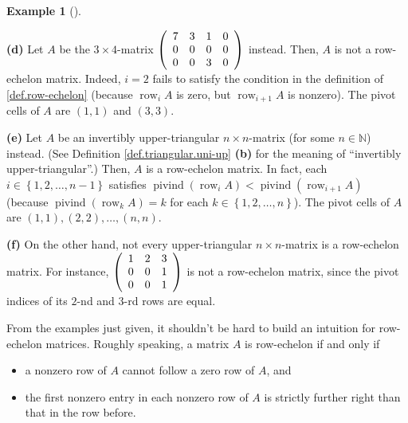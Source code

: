 \documentclass[numbers=enddot,12pt,final,onecolumn,notitlepage]{scrartcl}%
\theoremstyle{definition}
\newtheorem{exam}[theo]{Example}
\newenvironment{example}[1][]
{\begin{exam}[#1]\begin{leftbar}}
{\end{leftbar}\end{exam}}
\begin{document}
\begin{example}
\textbf{(d)} Let $A$ be the $3\times4$-matrix $\left(
\begin{array}
[c]{cccc}%
7 & 3 & 1 & 0\\
0 & 0 & 0 & 0\\
0 & 0 & 3 & 0
\end{array}
\right)  $ instead. Then, $A$ is not a row-echelon matrix. Indeed, $i=2$ fails
to satisfy the condition in the definition of \ref{def.row-echelon} (because
$\operatorname*{row}\nolimits_{i}A$ is zero, but $\operatorname*{row}%
\nolimits_{i+1}A$ is nonzero). The pivot cells of $A$ are $\left(  1,1\right)
$ and $\left(  3,3\right)  $.

\textbf{(e)} Let $A$ be an invertibly upper-triangular $n\times n$-matrix (for
some $n\in\mathbb{N}$) instead. (See Definition \ref{def.triangular.uni-up}
\textbf{(b)} for the meaning of \textquotedblleft invertibly
upper-triangular\textquotedblright.) Then, $A$ is a row-echelon matrix. In
fact, each $i\in\left\{  1,2,\ldots,n-1\right\}  $ satisfies
$\operatorname*{pivind}\left(  \operatorname*{row}\nolimits_{i}A\right)
<\operatorname*{pivind}\left(  \operatorname*{row}\nolimits_{i+1}A\right)  $
(because $\operatorname*{pivind}\left(  \operatorname*{row}\nolimits_{k}%
A\right)  =k$ for each $k\in\left\{  1,2,\ldots,n\right\}  $). The pivot cells
of $A$ are $\left(  1,1\right)  ,\left(  2,2\right)  ,\ldots,\left(
n,n\right)  $.

\textbf{(f)} On the other hand, not every upper-triangular $n\times n$-matrix
is a row-echelon matrix. For instance, $\left(
\begin{array}
[c]{ccc}%
1 & 2 & 3\\
0 & 0 & 1\\
0 & 0 & 1
\end{array}
\right)  $ is not a row-echelon matrix, since the pivot indices of its $2$-nd
and $3$-rd rows are equal.
\end{example}

From the examples just given, it shouldn't be hard to build an intuition for
row-echelon matrices. Roughly speaking, a matrix $A$ is row-echelon if and
only if

\begin{itemize}
\item a nonzero row of $A$ cannot follow a zero row of $A$, and

\item the first nonzero entry in each nonzero row of $A$ is strictly further
right than that in the row before.
\end{itemize}
\end{document}
